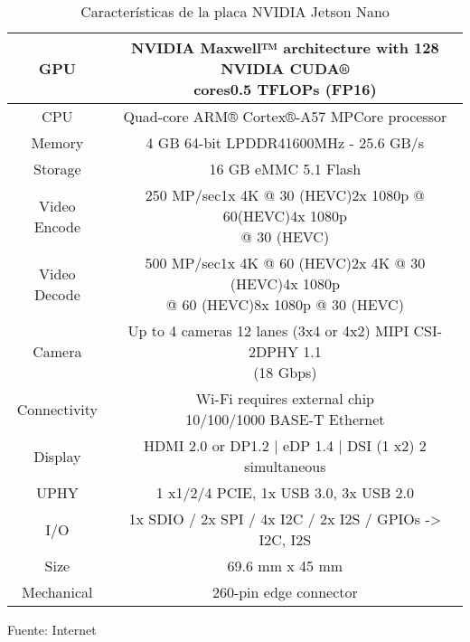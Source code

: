\begin{table}[H]
  \centering
  \begin{tabular}{|c|c|}
      \hline
      GPU & \parbox[c]{13cm}{NVIDIA Maxwell™ architecture with 128 NVIDIA CUDA®\\cores0.5 TFLOPs (FP16)}\\
      \hline
      CPU & Quad-core ARM® Cortex®-A57 MPCore processor\\ 
      \hline
      Memory & 4 GB 64-bit LPDDR41600MHz - 25.6 GB/s\\
      \hline
      Storage & 16 GB eMMC 5.1 Flash\\
      \hline
      Video Encode & \parbox[c]{13cm}{250 MP/sec1x 4K @ 30 (HEVC)2x 1080p @ 60(HEVC)4x 1080p\\@ 30 (HEVC)}\\
      \hline
      Video Decode & \parbox[c]{13cm}{500 MP/sec1x 4K @ 60 (HEVC)2x 4K @ 30 (HEVC)4x 1080p\\@ 60 (HEVC)8x 1080p @ 30 (HEVC)}\\
      \hline
      Camera & \parbox[c]{13cm}{Up to 4 cameras 12 lanes (3x4 or 4x2) MIPI CSI-2DPHY 1.1\\(18 Gbps)}\\
      \hline
      Connectivity & \parbox[c]{13cm}{Wi-Fi requires external chip\\10/100/1000 BASE-T Ethernet}\\
      \hline
      Display & HDMI 2.0 or DP1.2 | eDP 1.4 | DSI (1 x2) 2 simultaneous\\
      \hline
      UPHY & 1 x1/2/4 PCIE, 1x USB 3.0, 3x USB 2.0\\
      \hline
      I/O & 1x SDIO / 2x SPI / 4x I2C / 2x I2S / GPIOs -> I2C, I2S\\
      \hline
      Size & 69.6 mm x 45 mm\\
      \hline
      Mechanical & 260-pin edge connector\\
      \hline
  \end{tabular}
  \caption{Características de la placa NVIDIA Jetson Nano}{Fuente: Internet}
\end{table}